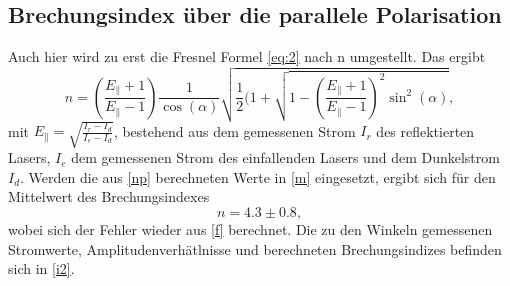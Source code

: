 \subsection{Brechungsindex über die parallele Polarisation}
Auch hier wird zu erst die Fresnel Formel \eqref{eq:2} nach n umgestellt. Das ergibt
\begin{equation}
  n=\left(\frac{E_{\|}+1}{E_{\|}-1}\right)\frac{1}{\cos(\alpha)}\sqrt{\frac{1}{2}(1+\sqrt{1-\left(\frac{E_{\|}+1}{E_{\|}-1}\right)^2\sin^2(\alpha)}},
  \label{np}
\end{equation}
mit $E_{\|}=\sqrt{\frac{I_r-I_d}{I_e-I_d}}$, bestehend aus dem gemessenen Strom $I_r$ des reflektierten Lasers, $I_e$ dem gemessenen Strom des einfallenden Lasers und dem Dunkelstrom $I_d$. Werden die aus \eqref{np} berechneten Werte in \eqref{m} eingesetzt, ergibt sich für den Mittelwert des Brechungsindexes 
\begin{equation*}
  n=4.3 \pm 0.8,
\end{equation*}
wobei sich der Fehler wieder aus \eqref{f} berechnet. Die zu den Winkeln gemessenen Stromwerte, Amplitudenverhätlnisse und berechneten Brechungsindizes befinden sich in \autoref{i2}.
